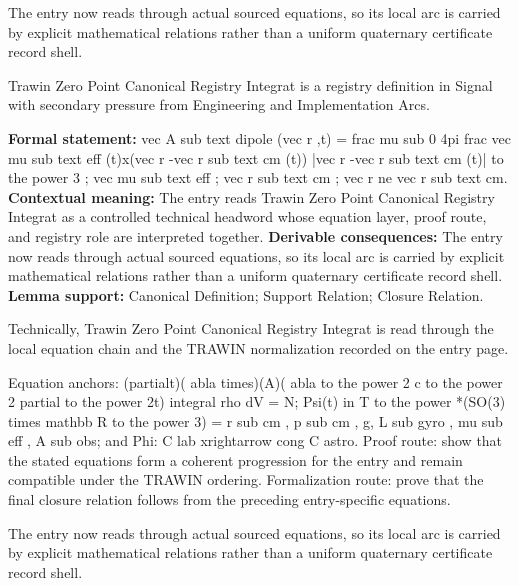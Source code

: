 The entry now reads through actual sourced equations, so its local arc is carried by explicit mathematical relations rather than a uniform quaternary certificate record shell.
\clearpage


\begingroup\small
{}
Trawin Zero Point Canonical Registry Integrat is a registry definition in Signal with secondary pressure from Engineering and Implementation Arcs.

\begingroup\footnotesize\setlength{\emergencystretch}{3em}\sloppy
\textbf{Formal statement:} vec A sub text dipole (vec r ,t) = frac mu sub 0 4pi frac vec mu sub text eff (t)x(vec r -vec r sub text cm (t)) |vec r -vec r sub text cm (t)| to the power 3 ; vec mu sub text eff ; vec r sub text cm ; vec r ne vec r sub text cm. \textbf{Contextual meaning:} The entry reads Trawin Zero Point Canonical Registry Integrat as a controlled technical headword whose equation layer, proof route, and registry role are interpreted together. \textbf{Derivable consequences:} The entry now reads through actual sourced equations, so its local arc is carried by explicit mathematical relations rather than a uniform quaternary certificate record shell. \textbf{Lemma support:} Canonical Definition; Support Relation; Closure Relation.\par
\endgroup

Technically, Trawin Zero Point Canonical Registry Integrat is read through the local equation chain and the TRAWIN normalization recorded on the entry page.

Equation anchors: (partialt)( abla times)(A)( abla to the power 2   c to the power  2 partial to the power 2t) integral rho dV = N; Psi(t) in T to the power *(SO(3) times mathbb R to the power 3) = r sub cm , p sub cm , g, L sub gyro , mu sub eff , A sub obs; and Phi: C lab xrightarrow cong C astro. Proof route: show that the stated equations form a coherent progression for the entry and remain compatible under the TRAWIN ordering. Formalization route: prove that the final closure relation follows from the preceding entry-specific equations.

The entry now reads through actual sourced equations, so its local arc is carried by explicit mathematical relations rather than a uniform quaternary certificate record shell.
\endgroup

